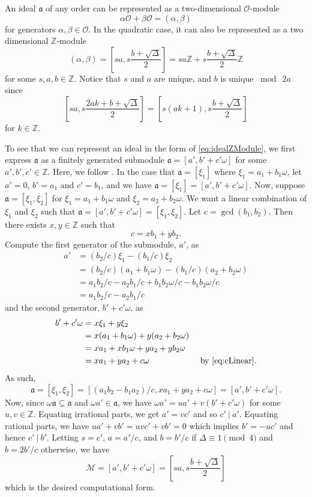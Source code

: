 \documentclass{ucalgthes1}
\theoremstyle{plain}
\theoremstyle{definition}
\newcommand{\MM}{\mathcal{M}}
\newcommand{\OO}{\mathcal{O}}
\newcommand{\ZZ}{\mathbb{Z}}
\begin{document}
\noindent
An ideal $\mathfrak{a}$ of any order can be represented as a two-dimensional $\OO$-module
\[
	\alpha \OO + \beta \OO = (\alpha, \beta)
\]
for generators $\alpha, \beta \in \OO$.  In the quadratic case, it can also be represented as a two dimensional $\ZZ$-module
\begin{equation}
\label{eq:idealZModule}
	(\alpha, \beta) = \left[sa, s \frac{b+ \sqrt{\Delta}}{2} \right] = sa \ZZ + s\frac{b + \sqrt{\Delta}}{2} \ZZ
\end{equation}
for some $s, a, b \in \ZZ$.  Notice that $s$ and $a$ are unique, and $b$ is unique $\bmod~2a$ since
\begin{equation*}
	\left[sa, s\frac{2ak+b+\sqrt{\Delta}}{2}\right] = \left[s(ak+1), s\frac{b+\sqrt{\Delta}}{2}\right]
\end{equation*}
for $k \in \ZZ$.

To see that we can represent an ideal in the form of \eqref{eq:idealZModule}, we first express $\mathfrak a$ as a finitely generated submodule $\mathfrak a=[a',b'+c'\omega]$ for some $a',b',c' \in \ZZ$.  Here, we follow \cite[pp~85-86]{Jac09}.  In the case that $\mathfrak a = [\xi_1]$ where $\xi_1 = a_1+b_1\omega$, let $a'=0$, $b' = a_1$ and $c'=b_1$, and we have $\mathfrak a = [\xi_1] = [a', b'+c'\omega]$.  Now, suppose $\mathfrak a = [\xi_1, \xi_2]$ for $\xi_1 = a_1 + b_1\omega$ and $\xi_2 = a_2+b_2\omega$.  We want a linear combination of $\xi_1$ and $\xi_2$ such that $\mathfrak a = [a',b'+c'\omega] = [\xi_1, \xi_2]$.  Let $c = \gcd(b_1, b_2)$.  Then there exists $x,y \in \ZZ$ such that 
\begin{equation}
\label{eq:cLinear}
	c = xb_1 + yb_2.
\end{equation}
Compute the first generator of the submodule, $a'$, as
\begin{align*}
	a' &= (b_2/c) \xi_1 - (b_1/c) \xi_2  \\
	&= (b_2/c) (a_1+b_1\omega) - (b_1/c) (a_2+b_2\omega)  \\
	&= a_1b_2/c -a_2b_1/c + b_1b_2\omega/c -b_1b_2\omega/c \\
	&= a_1b_2/c - a_2b_1/c
\end{align*}
and the second generator, $b'+c'\omega$, as
\begin{align*}
	b'+c'\omega &= x\xi_1 + y\xi_2 \\
	&= x(a_1+b_1\omega) + y(a_2+b_2\omega) \\
	&= xa_1+xb_1\omega + ya_2+yb_2\omega \\
	&= xa_1 + ya_2 + c\omega & \mbox{ by \eqref{eq:cLinear}}.
\end{align*}
As such, 
\[
	\mathfrak a = [\xi_1,\xi_2] = [(a_1b_2-b_1a_2)/c, xa_1+ya_2+c\omega] = [a',b'+c'\omega].
\]
Now, since $\omega\mathfrak a \subseteq \mathfrak a$ and $\omega a' \in \mathfrak a$, we have $\omega a' = ua' + v(b'+c'\omega)$ for some $u,v \in \ZZ$. Equating irrational parts, we get $a' = vc'$ and so $c'~|~a'$.  Equating rational parts, we have $ua'+vb' = uvc'+vb' = 0$ which implies $b' = -uc'$ and hence $c'~|~b'$.  Letting $s=c'$, $a=a'/c$, and $b = b'/c$ if $\Delta \equiv 1 \pmod 4$ and $b = 2b'/c$ otherwise, we have
\[
	\MM = [a', b'+c'\omega] = \left[sa, s\frac{b+ \sqrt{\Delta}}{2} \right]
\]
which is the desired computational form.
\end{document}
